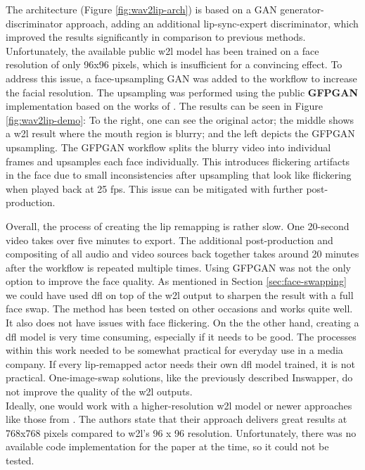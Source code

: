 \documentclass[
  a4paper,  %
  twoside,  %
  bibliography=totoc,
  headsepline,
  cleardoublepage=empty,
  parskip=half,
  draft=false
]{scrbook}
\begin{document}
The architecture (Figure \ref{fig:wav2lip-arch}) is based on a GAN generator-discriminator approach, adding an additional lip-sync-expert discriminator, which improved the results significantly in comparison to previous methods. \\
Unfortunately, the available public \gls{w2l} model has been trained on a face resolution of only 96x96 pixels, which is insufficient for a convincing effect. To address this issue, a face-upsampling GAN was added to the workflow to increase the facial resolution. The upsampling was performed using the public \textbf{GFPGAN} implementation based on the works of \citet{wangNeuralSourcefilterbasedWaveform2019}. The results can be seen in Figure \ref{fig:wav2lip-demo}: To the right, one can see the original actor; the middle shows a \gls{w2l} result where the mouth region is blurry; and the left depicts the GFPGAN upsampling. The GFPGAN workflow splits the blurry video into individual frames and upsamples each face individually. This introduces flickering artifacts in the face due to small inconsistencies after upsampling that look like flickering when played back at 25 \gls{fps}. This issue can be mitigated with further post-production.

Overall, the process of creating the lip remapping is rather slow. One 20-second video takes over five minutes to export. The additional post-production and compositing of all audio and video sources back together takes around 20 minutes after the workflow is repeated multiple times. Using GFPGAN was not the only option to improve the face quality. As mentioned in Section \ref{sec:face-swapping} we could have used \gls{dfl} on top of the \gls{w2l} output to sharpen the result with a full face swap. The method has been tested on other occasions and works quite well. It also does not have issues with face flickering. On the the other hand, creating a \gls{dfl} model is very time consuming, especially if it needs to be good. The processes within this work needed to be somewhat practical for everyday use in a media company. If every lip-remapped actor needs their own \gls{dfl} model trained, it is not practical. One-image-swap solutions, like the previously described Inswapper, do not improve the quality of the \gls{w2l} outputs. \\
Ideally, one would work with a higher-resolution \gls{w2l} model or newer approaches like those from \citet{guptaGeneratingUltraHighResolution2023}. The authors state that their approach delivers great results at 768x768 pixels compared to \gls{w2l}'s 96 x 96 resolution. Unfortunately, there was no available code implementation for the paper at the time, so it could not be tested.
\end{document}
